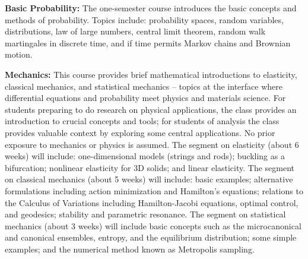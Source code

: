 \documentclass[11pt]{article}
\begin{document}
{\bf Basic Probability:} The one-semester course introduces the basic concepts
and methods of probability. Topics include: probability spaces, random
variables, distributions, law of large numbers, central limit theorem, random
walk martingales in discrete time, and if time permits Markov chains and
Brownian motion.

{\bf Mechanics:} This course provides brief mathematical introductions to
elasticity, classical mechanics, and statistical mechanics -- topics at the
interface where differential equations and probability meet physics and
materials science. For students preparing to do research on physical
applications, the class provides an introduction to crucial concepts and tools;
for students of analysis the class provides valuable context by exploring some
central applications. No prior exposure to mechanics or physics is assumed.  The
segment on elasticity (about 6 weeks) will include: one-dimensional models
(strings and rods); buckling as a bifurcation; nonlinear elasticity for 3D
solids; and linear elasticity. The segment on classical mechanics (about
5 weeks) will include: basic examples; alternative formulations including action
minimization and Hamilton's equations; relations to the Calculus of Variations
including Hamilton-Jacobi equations, optimal control, and geodesics; stability
and parametric resonance. The segment on statistical mechanics (about 3 weeks)
will include basic concepts such as the microcanonical and canonical ensembles,
entropy, and the equilibrium distribution; some simple examples; and the
numerical method known as Metropolis sampling.
\end{document}
